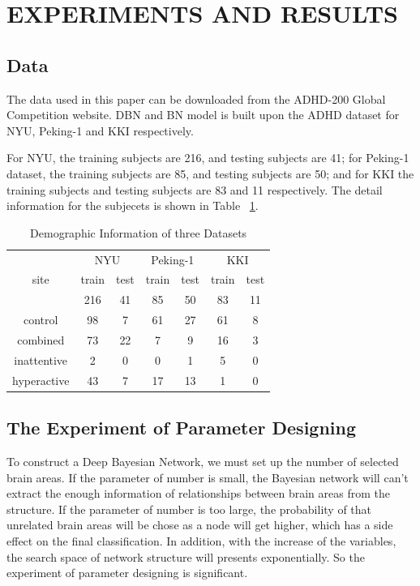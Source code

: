 \documentclass[10pt,twocolumn,letterpaper]{article}
\begin{document}
\section{EXPERIMENTS AND RESULTS}
\subsection{Data}
The data used in this paper can be downloaded from the ADHD-200 Global Competition website. DBN and BN model is built upon the ADHD dataset for NYU, Peking-1 and KKI respectively.


For NYU, the training subjects are 216, and testing subjects are 41; for Peking-1 dataset, the training subjects are 85, and testing subjects are 50; and for KKI the training subjects and testing subjects are 83 and 11 respectively. The detail information for the subjecets is shown in Table ~\ref{tab:Information}.


\begin{table}[h]
\label{tab:Information}
\begin{center}
\begin{tabular}{|c|c|c|c|c|c|c|}
\hline
\multirow{3}{*}{site}	& \multicolumn{2}{c|}{NYU} & \multicolumn{2}{c|}{Peking-1} & \multicolumn{2}{c|}{KKI} \\
\cline{2-7}\rule{0pt}{5pt}
					 	& train &  test  & train	& test 	& train & test  \\
						& 216	& 41	  &    85   &   50  &   83   &   11 \\ [2pt]
\hline \rule{0pt}{12pt}
control					& 98	    & 7    &    61   &    27 &   61    &   8 \\
combined					& 73		& 22   &    7    &    9  &   16    &   3 \\
inattentive				& 2		& 0    &    0    &    1  &   5     &   0 \\
hyperactive				& 43		& 7    &    17   &    13 &   1    &   0 \\[2pt]
\hline
\end{tabular}
\end{center}
\caption{Demographic Information of three Datasets}
\end{table}



\subsection{The Experiment of Parameter Designing}
To construct a Deep Bayesian Network, we must set up the number of selected brain areas. If the parameter of number is small, the Bayesian network will can't extract the enough information of relationships between brain areas from the structure. If the parameter of number is too large, the probability of that unrelated brain areas will be chose as a node will get higher, which has a side effect on the final classification. In addition,  with the increase of the variables, the search space of network structure will presents exponentially. So the experiment of parameter designing is significant.
\end{document}
